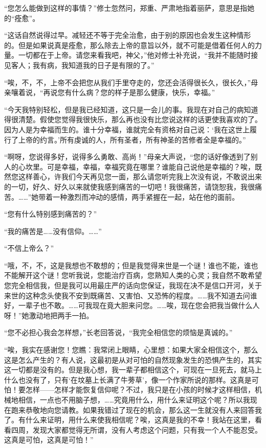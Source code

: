 \par “您怎么能做到这样的事情？”修士忽然问，郑重、严肃地指着丽萨，意思是指她的“痊愈”。
\par “这话自然说得过早。减轻还不等于完全治愈，由于别的原因也会发生这种情形的。但是如果说真是痊愈，那么除去上帝的意旨以外，就不可能是借着任何人的力量。一切都在于上帝。请您来看我吧，神父，”他对修士补充说，“我并不能随时接见客人；我有病，我知道我的日子是有限的了。”
\par “唉，不，不，上帝不会把您从我们手里夺走的，您还会活得很长久，很长久，”母亲嚷着说，“再说您有什么病？您的样子是那么健康，快乐，幸福。”
\par “今天我特别轻松，但是我已经知道，这只是一会儿的事。我现在对自己的病知道得很清楚。假使您觉得我很快乐，那么再也没有比您说这样的话更使我喜欢的了。因为人是为幸福而生的。谁十分幸福，谁就完全有资格对自己说：‘我在这世上履行了上帝的约言。’所有虔诚的人，所有圣者，所有神圣的苦修者全是幸福的。”
\par “啊呀，您说得多好，说得多么勇敢、高尚！”母亲大声说，“您的话好像透到了别人的心坎里。可是幸福，幸福，幸福究竟在哪里？谁能自己说他是幸福的？唉，既然您这样善心，许我们今天再见您一面，那么请您听完我上次没有说，不敢说出来的一切，好久、好久以来就使我感到痛苦的一切吧！我很痛苦，请饶恕我，我很痛苦。……”她带着一种激烈而冲动的感情，两手紧握在一起，站在他的面前。
\par “您有什么特别感到痛苦的？”
\par “我的痛苦是……没有信仰。……”
\par “不信上帝么？”
\par “哦，不，不，这是我想也不敢想的；但是我觉得来世是一个谜！谁也不能，谁也不能解开这个谜！您听我说，您能治疗百病，您熟知人类的心灵；我自然不敢希望您完全相信我，但是我可以用最庄严的话向您保证，我现在决不是信口开河，关于来世的这种念头使我不安到既痛苦、又害怕、又恐怖的程度。……我不知道去问谁好，一辈子也不敢。……可我现在竟大胆来问您。……唉，现在您会把我当做什么人呀！”她激动地把两手一拍。
\par “您不必担心我会怎样想，”长老回答说，“我完全相信您的烦恼是真诚的。”
\par “唉，我实在感谢您！您瞧：我常闭上眼睛，心里想：如果大家全相信这个，那么这是怎么产生的？有人说，这最初是从对可怕的自然现象发生的恐惧产生的，其实这一切都是没有的。但是我心想，我一辈子都相信这个，可现在一旦死去，就马上什么也没有了，只有‘在坟墓上长满了牛蒡草’，像一个作家所说的那样。这真是可怕！要怎样——怎样才能恢复信仰呢？不过，我只是在小孩的时候才这样相信，机械地相信，一点也不用脑子想，……究竟用什么，用什么来证明这个呢？所以我现在跑来恭敬地向您请教。如果我错过了现在的机会，那么这一生就没有人来回答我了。有什么来证明，用什么来使我相信呢？唉，这真是我的不幸！我站在这里，看看四周，发现大家都觉得无所谓，没有人考虑这个问题，只有我一个人不能忍受。这真是可怕，这真是可怕！”
